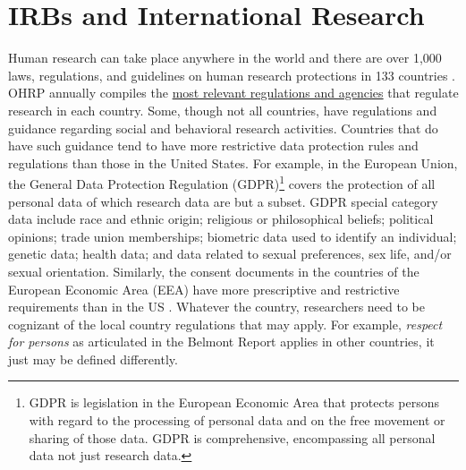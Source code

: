 \hypertarget{irbs-and-international-research}{%
\section{IRBs and International Research}\label{irbs-and-international-research}}

Human research can take place anywhere in the world and there are over 1,000 laws, regulations, and guidelines on human research protections in 133 countries \citep{officeforhumanresearchprotections2020}. OHRP annually compiles the \href{https://www.hhs.gov/ohrp/sites/default/files/2020-international-compilation-of-human-research-standards.pdf}{most relevant regulations and agencies} that regulate research in each country. Some, though not all countries, have regulations and guidance regarding social and behavioral research activities. Countries that do have such guidance tend to have more restrictive data protection rules and regulations than those in the United States. For example, in the European Union, the General Data Protection Regulation (GDPR)\footnote{GDPR is legislation in the European Economic Area that protects persons with regard to the processing of personal data and on the free movement or sharing of those data. GDPR is comprehensive, encompassing all personal data not just research data.} \citep{europeanparliamentandcounciloftheeuropeanunion2016} covers the protection of all personal data of which research data are but a subset. GDPR special category data include race and ethnic origin; religious or philosophical beliefs; political opinions; trade union memberships; biometric data used to identify an individual; genetic data; health data; and data related to sexual preferences, sex life, and/or sexual orientation. Similarly, the consent documents in the countries of the European Economic Area (EEA) have more prescriptive and restrictive requirements than in the US \citep{officeforhumanresearchprotections2018}. Whatever the country, researchers need to be cognizant of the local country regulations that may apply. For example, \emph{respect for persons} as articulated in the Belmont Report applies in other countries, it just may be defined differently.

